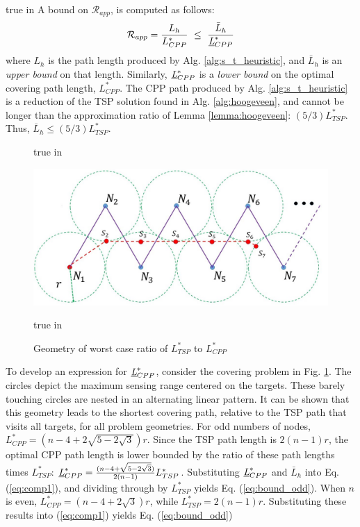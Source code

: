 \documentclass[letterpaper, 10 pt, conference]{ieeeconf}
\theoremstyle{definition}
\newcommand{\Rs}{\mathcal{R}}
\begin{document}
 true in
  A bound on $\Rs_{app}$, is computed as follows:
  \begin{equation} \label{eq:comp1}
      \Rs_{app} = \frac{L_h}{L^{*}_{CPP}} \ \le \  \frac{\bar{L}_h}{\underbar{\em L}^{*}_{CPP}}
  \end{equation}
where $L_h$ is the path length produced by Alg. \ref{alg:s_t_heuristic}, and $\bar{L}_h$ is an {\em upper bound} on that length.  Similarly, $\underbar{\em L}^{*}_{CPP}$ is a {\em lower bound} on the optimal covering path length, $L^{*}_{CPP}$.  The CPP path produced by Alg. \ref{alg:s_t_heuristic} is a
reduction of the TSP solution found in Alg. \ref{alg:hoogeveen}, and cannot be longer than the approximation ratio of Lemma \ref{lemma:hoogeveen}: 
$(5/3)L^{*}_{TSP}$.  Thus, $\bar{L}_h\le (5/3)L^{*}_{TSP}$.
%
\begin{figure}[htb]
   true in
  \centerline{\includegraphics[height=1.2 true in]{CompetitivenessDiagram.jpg}}
    \caption{Geometry of worst case ratio of $L^{*}_{TSP}$ to $L^*_{CPP}$}
    \label{fig:CompetitivenessDiagram}
     true in
\end{figure}

To develop an expression for $\underbar{\em L}^{*}_{CPP}$, consider the covering problem in Fig. \ref{fig:CompetitivenessDiagram}. The circles depict the maximum sensing range centered on the targets.  These barely touching circles are nested in an alternating linear pattern.  It can be shown that this geometry leads to the shortest covering path, relative to the TSP path that visits all targets, for all problem geometries.  For odd numbers of nodes, $L^{*}_{CPP} = (n-4 + 2 \sqrt{5-2\sqrt{3}})r$. Since the TSP path length is $2(n-1)r$, the optimal CPP path length is lower bounded by the ratio of these path lengths times $L^{*}_{TSP}$: $\underbar{\em L}^{*}_{CPP} = \frac{(n-4 + \sqrt{5-2\sqrt{3}})}{2(n-1)} L^{*}_{TSP}$.  Substituting $\underbar{\em L}^{*}_{CPP}$ and $\bar{L}_{h}$ into Eq. (\ref{eq:comp1}), and dividing through by $L^{*}_{TSP}$ yields Eq. (\ref{eq:bound_odd}).  When $n$ is even,  $L^{*}_{CPP}=(n-4 + 2\sqrt{3})r$, while $L^{*}_{TSP}=2(n-1)r$.  Substituting these results into (\ref{eq:comp1}) yields Eq. (\ref{eq:bound_odd})
\end{document}
